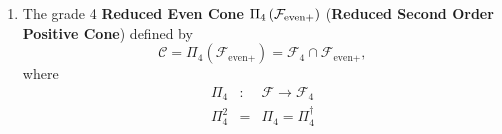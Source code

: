 \documentclass[aps,preprint]{revtex4}
\begin{document}
\begin{enumerate}
\begin{enumerate}
\begin{enumerate}
\item 
\begin{equation}
b_{\text{even}}=b_{\text{even}}^{\dagger }=a_{\text{even}}^{\dagger }a_{%
\text{even}}+a_{\text{odd}}^{\dagger }a_{\text{odd}}\in \mathcal{F}_{\text{%
even}+}
\end{equation}%
and

\item 
\begin{equation}
b_{\text{odd}}=b_{\text{odd}}^{\dagger }=a_{\text{odd}}^{\dagger }a_{\text{%
even}}+a_{\text{even}}^{\dagger }a_{\text{odd}}
\end{equation}

\item 
\begin{equation}
\limfunc{Tr}\left( b_{\text{odd}}\right) =0
\end{equation}%
thus $b_{\text{odd}}$ must have positive and \textbf{negative} spectrum.

\item Hence in general elements $b$ of $\mathcal{F}_{+}$ contain components $%
b_{\text{odd}}$ that do not belong to $\mathcal{F}_{\text{even}},$ which can
be seen by considering that the sum of two commuting self adjoint operators $%
A$ and $B$ that have spectral decomposions 
\begin{equation}
A=i\sum_{1\leq j<k\leq 2r}c_{jk}x_{j}x_{k}=\int_{a\in \mathbb{R}%
_{+}}aP\left( a\right) da
\end{equation}%
and 
\begin{equation}
B=\sum_{1\leq j\leq 2r}c_{j}x_{j}\ =\int_{b\in \mathbb{R}}bP_{B}\left(
b\right) db,
\end{equation}%
where%
\begin{eqnarray}
a &>&b \\
\left[ P\left( a\right) ,P_{B}\left( b\right) \right] &=&0\quad \\
\forall a,b &\in &\mathbb{R}
\end{eqnarray}%
so that 
\begin{equation}
a+b\geq 0.
\end{equation}
\end{enumerate}
\end{enumerate}

\item The grade 4 \textbf{Reduced Even Cone} $\Pi _{4}\left( \mathcal{F}_{%
\text{even}+}\right) $ (\textbf{Reduced Second Order Positive Cone}) defined
by 
\begin{equation}
\mathcal{C}=\Pi _{4}\left( \mathcal{F}_{\text{even}+}\right) =\mathcal{F}%
_{4}\cap \mathcal{F}_{\text{even}+},
\end{equation}%
where 
\begin{eqnarray}
\Pi _{4} &:&\mathcal{F\rightarrow F}_{4} \\
\Pi _{4}^{2} &=&\Pi _{4}=\Pi _{4}^{\dagger }
\end{eqnarray}


\end{enumerate}
\end{document}
